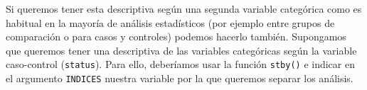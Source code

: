 \documentclass[
]{book}
\newenvironment{Shaded}{\begin{snugshade}}{\end{snugshade}}
\newcommand{\AttributeTok}[1]{\textcolor[rgb]{0.77,0.63,0.00}{#1}}
\newcommand{\ConstantTok}[1]{\textcolor[rgb]{0.00,0.00,0.00}{#1}}
\newcommand{\FunctionTok}[1]{\textcolor[rgb]{0.00,0.00,0.00}{#1}}
\newcommand{\NormalTok}[1]{#1}
\newcommand{\SpecialCharTok}[1]{\textcolor[rgb]{0.00,0.00,0.00}{#1}}
\newcommand{\StringTok}[1]{\textcolor[rgb]{0.31,0.60,0.02}{#1}}
\begin{document}
Si queremos tener esta descriptiva según una segunda variable categórica como es habitual en la mayoría de análisis estadísticos (por ejemplo entre grupos de comparación o para casos y controles) podemos hacerlo también. Supongamos que queremos tener una descriptiva de las variables categóricas según la variable caso-control (\texttt{status}). Para ello, deberíamos usar la función \texttt{stby()} e indicar en el argumento \texttt{INDICES} nuestra variable por la que queremos separar los análisis.

\begin{Shaded}
\end{Shaded}
\end{document}
